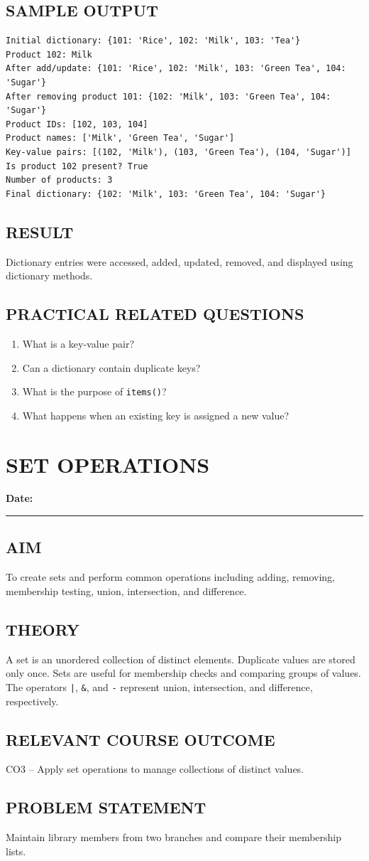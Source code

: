 \documentclass[12pt,a4paper]{report}
\newcommand{\experimentdate}{\hfill\textbf{Date:} \rule{3cm}{0.4pt}}
\newcommand{\aim}[1]{\section*{AIM}#1}
\newcommand{\result}[1]{\section*{RESULT}#1}
\newcommand{\courseoutcome}[1]{\section*{RELEVANT COURSE OUTCOME}#1}
\newcommand{\questions}[1]{\section*{PRACTICAL RELATED QUESTIONS}#1}
\newcommand{\sampleoutput}{\section*{SAMPLE OUTPUT}}
\begin{document}
\sampleoutput
\begin{verbatim}
Initial dictionary: {101: 'Rice', 102: 'Milk', 103: 'Tea'}
Product 102: Milk
After add/update: {101: 'Rice', 102: 'Milk', 103: 'Green Tea', 104: 'Sugar'}
After removing product 101: {102: 'Milk', 103: 'Green Tea', 104: 'Sugar'}
Product IDs: [102, 103, 104]
Product names: ['Milk', 'Green Tea', 'Sugar']
Key-value pairs: [(102, 'Milk'), (103, 'Green Tea'), (104, 'Sugar')]
Is product 102 present? True
Number of products: 3
Final dictionary: {102: 'Milk', 103: 'Green Tea', 104: 'Sugar'}
\end{verbatim}

\result{Dictionary entries were accessed, added, updated, removed, and displayed using dictionary methods.}

\questions{
\begin{enumerate}
\item What is a key-value pair?
\item Can a dictionary contain duplicate keys?
\item What is the purpose of \texttt{items()}?
\item What happens when an existing key is assigned a new value?
\end{enumerate}}

\chapter{SET OPERATIONS}
\experimentdate

\aim{To create sets and perform common operations including adding, removing, membership testing, union, intersection, and difference.}

\section*{THEORY}
A set is an unordered collection of distinct elements. Duplicate values are stored only
once. Sets are useful for membership checks and comparing groups of values. The
operators \texttt{|}, \texttt{\&}, and \texttt{-} represent union, intersection, and
difference, respectively.

\courseoutcome{CO3 -- Apply set operations to manage collections of distinct values.}

\section*{PROBLEM STATEMENT}
Maintain library members from two branches and compare their membership lists.
\end{document}
